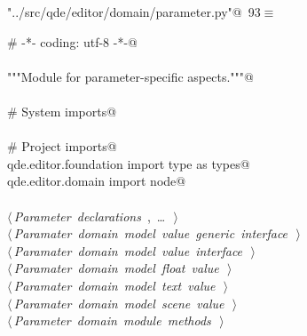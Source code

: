 \documentclass[
    a4paper,      %
    10pt,         %
    openright,    %
    notitlepage,  %
    parskip=half, %
]{scrreprt}       %
\theoremstyle{definition}                    %
\begin{document}
\begin{flushleft} \small
\begin{minipage}{\linewidth}\label{scrap149}\raggedright\small
{} \verb@"../src/qde/editor/domain/parameter.py"@\nobreak\ {\footnotesize {93}}$\equiv$
\vspace{-1ex}
\begin{list}{}{} \item
\mbox{}\lstinline@# -*- coding: utf-8 -*-@\\
\mbox{}\lstinline@@\\
\mbox{}\lstinline@"""Module for parameter-specific aspects."""@\\
\mbox{}\lstinline@@\\
\mbox{}\lstinline@# System imports@\\
\mbox{}\lstinline@@\\
\mbox{}\lstinline@# Project imports@\\
\mbox{}\lstinline@from qde.editor.foundation import type as types@\\
\mbox{}\lstinline@from qde.editor.domain import node@\\
\mbox{}\lstinline@@\\
\mbox{}\lstinline@@\hbox{$\langle\,${\itshape Parameter declarations}\nobreak\ {\footnotesize {}, \ldots\ }$\,\rangle$}\lstinline@@\\
\mbox{}\lstinline@@\hbox{$\langle\,${\itshape Paramater domain model value generic interface}\nobreak\ {\footnotesize {}}$\,\rangle$}\lstinline@@\\
\mbox{}\lstinline@@\hbox{$\langle\,${\itshape Paramater domain model value interface}\nobreak\ {\footnotesize {}}$\,\rangle$}\lstinline@@\\
\mbox{}\lstinline@@\hbox{$\langle\,${\itshape Paramater domain model float value}\nobreak\ {\footnotesize {}}$\,\rangle$}\lstinline@@\\
\mbox{}\lstinline@@\hbox{$\langle\,${\itshape Paramater domain model text value}\nobreak\ {\footnotesize {}}$\,\rangle$}\lstinline@@\\
\mbox{}\lstinline@@\hbox{$\langle\,${\itshape Paramater domain model scene value}\nobreak\ {\footnotesize {}}$\,\rangle$}\lstinline@@\\
\mbox{}\lstinline@@\hbox{$\langle\,${\itshape Parameter domain module methods}\nobreak\ {\footnotesize {}}$\,\rangle$}\lstinline@@\\
\mbox{}\lstinline@@{\NWsep}
\end{list}
\vspace{-1.5ex}
\footnotesize
\begin{list}{}{\setlength{\itemsep}{-\parsep}\setlength{\itemindent}{-\leftmargin}}

\item{}
\end{list}
\end{minipage}\vspace{4ex}
\end{flushleft}
\end{document}
